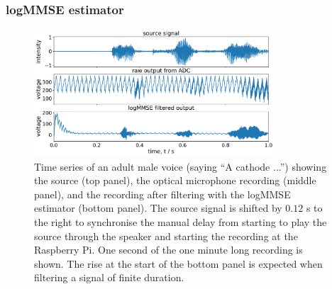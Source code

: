 \documentclass[paper-main.tex]{subfiles}
\begin{document}








\subsubsection{logMMSE estimator}
\label{sec:logmmse}


\begin{figure}
	\includegraphics[width=0.8\textwidth]{figures/combined_timeseries_melatos_shift_source.pdf}
	\caption{Time series of an adult male voice (saying ``A cathode ...'') showing the source (top panel), the optical microphone recording (middle panel), and the recording after filtering with the logMMSE estimator (bottom panel). The source signal is shifted by $0.12$ s to the right to synchronise the manual delay from starting to play the source through the speaker and starting the recording at the Raspberry Pi. One second of the one minute long recording is shown. The rise at the start of the bottom panel is expected when filtering a signal of finite duration.}
	\label{fig:logMMSE_timeseries}
\end{figure}
\end{document}
